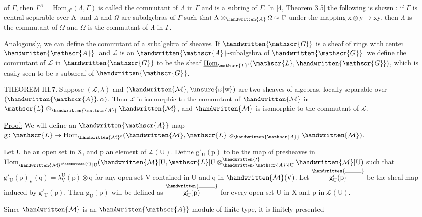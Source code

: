 of $\Gamma$, then $\Gamma^\Lambda=\mathrm{Hom}_{\Lambda^{\mathrm e}}(\Lambda,\Gamma)$ is called the \uline{commutant of $\Lambda$ in $\Gamma$} and is a subring of $\Gamma$. In [4, Theorem 3.5] the following is shown : if $\Gamma$ is central separable over $\mathrm A$, and $\Lambda$ and $\Omega$ are subalgebras of $\Gamma$ such that $\Lambda\otimes_{\handwritten{A}}\Omega\approx\Gamma$ under the mapping $\mathrm{x}\otimes\mathrm{y}\longrightarrow\mathrm{xy}$, then $\Lambda$ is the commutant of $\Omega$ and $\Omega$ is the commutant of $\Lambda$ in $\Gamma$.

Analogously, we can define the commutant of a subalgebra of sheaves. If $\handwritten{\mathscr{G}}$ is a sheaf of rings with center $\handwritten{\mathscr{A}}$, and $\mathscr{L}$ is an $\handwritten{\mathscr{A}}$-subalgebra of $\handwritten{\mathscr{G}}$, we define the commutant of $\mathscr{L}$ in $\handwritten{\mathscr{G}}$ to be the sheaf $\underline{\mathrm{Hom}}_{\mathscr{L}^{\mathrm e}}(\mathscr{L},\handwritten{\mathscr{G}})$, which is easily seen to be a subsheaf of $\handwritten{\mathscr{G}}$.

THEOREM III.7. Suppose $(\mathscr{L},\lambda)$ and $(\handwritten{\mathcal{M}},\unsure{\omega|\mathrm w})$ are two sheaves of algebras, locally separable over $(\handwritten{\mathscr{A}},\alpha)$. Then $\mathscr{L}$ is isomorphic to the commutant of $\handwritten{\mathcal{M}}$ in $\mathscr{L}\otimes_{\handwritten{\mathscr{A}}}\handwritten{\mathcal{M}}$, and $\handwritten{\mathcal{M}}$ is isomorphic to the commutant of $\mathscr{L}$.

\uline{Proof:} We will define an $\handwritten{\mathscr{A}}$-map $\mathrm{g}\colon \mathscr{L}\to \underline{\mathrm{Hom}}_{\handwritten{\mathcal{M}}^{\mathrm e}}(\handwritten{\mathcal{M}},\mathscr{L}\otimes_{\handwritten{\mathscr{A}}}\handwritten{\mathcal{M}})$.

Let $\mathrm U$ be an open set in $\mathrm X$, and $\mathrm p$ an element of $\mathscr{L}(\mathrm U)$. Define $\mathrm{g}'_{\mathrm U}(\mathrm p)$ to be the map of presheaves in $\mathrm{Hom}_{\handwritten{\mathcal{M}}^{\mathrm e\handwritten{'}}|\mathrm U}(\handwritten{\mathcal{M}}|\mathrm U,\mathscr{L}|\mathrm U\otimes_{\handwritten{\mathscr{A}}|\mathrm U}^{\handwritten{\prime}}\handwritten{\mathcal{M}}|\mathrm U)$ such that $\mathrm{g}'_{\mathrm U}(\mathrm p)_{\mathrm V}(\mathrm q)=\lambda_{\mathrm V}^{\mathrm U}(\mathrm p)\otimes\mathrm q$ for any open set $\mathrm V$ contained in $\mathrm U$ and $\mathrm q$ in $\handwritten{\mathcal{M}}(\mathrm V)$. Let $\overset{\handwritten{\rule{2.4em}{0.4pt}}}{\mathrm{g}'_{\mathrm U}(\mathrm p)}$ be the sheaf map induced by $\mathrm{g}'_{\mathrm U}(\mathrm p)$. Then $\mathrm{g}_{\mathrm U}(\mathrm p)$ will be defined as $\overset{\handwritten{\rule{2.4em}{0.4pt}}}{\mathrm{g}'_{\mathrm U}(\mathrm p)}$ for every open set $\mathrm U$ in $\mathrm X$ and $\mathrm p$ in $\mathscr{L}(\mathrm U)$.

Since $\handwritten{\mathcal{M}}$ is an $\handwritten{\mathscr{A}}$-module of finite type, it is finitely presented
